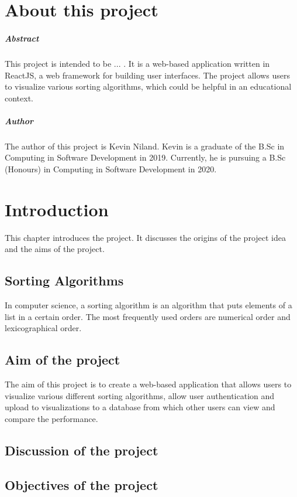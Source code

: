 \chapter*{About this project}
\paragraph{Abstract}
This project is intended to be ... . It is a web-based application written in ReactJS, a web framework for building user interfaces. The project allows users to visualize various sorting algorithms, which could be helpful in an educational context.

\paragraph{Author} 
The author of this project is Kevin Niland. Kevin is a graduate of the B.Sc in Computing in Software Development in 2019. Currently, he is pursuing a B.Sc (Honours) in Computing in Software Development in 2020.

\chapter{Introduction}
This chapter introduces the project. It discusses the origins of the project idea and the aims of the project.

\section{Sorting Algorithms}
In computer science, a sorting algorithm is an algorithm that puts elements of a list in a certain order. The most frequently used orders are numerical order and lexicographical order.

\section{Aim of the project}
The aim of this project is to create a web-based application that allows users to visualize various different sorting algorithms, allow user authentication and upload to visualizations to a database from which other users can view and compare the performance.

\section{Discussion of the project}


\section{Objectives of the project}

